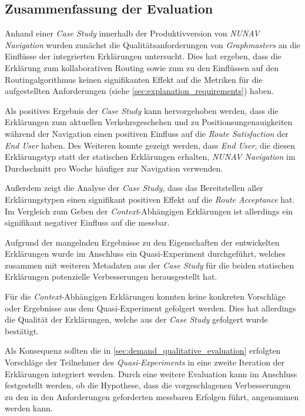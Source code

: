 \subsection{Zusammenfassung der Evaluation}

Anhand einer \textit{Case Study} innerhalb der Produktivversion von \textit{NUNAV Navigation} wurden zunächst die Qualitätsanforderungen von \textit{Graphmasters} an die Einflüsse der integrierten Erklärungen untersucht. Dies hat ergeben, dass die Erklärung zum kollaborativen Routing sowie zum zu den Einflüssen auf den Routingalgorithmus keinen signifikanten Effekt auf die Metriken für die aufgestellten Anforderungen (siehe \autoref{sec:explanation_requirements}) haben.

Als positives Ergebnis der \textit{Case Study} kann hervorgehoben werden, dass die Erklärungen zum aktuellen Verkehrsgeschehen und zu Positionsungenauigkeiten während der Navigation einen positiven Einfluss auf die \textit{Route Satisfaction} der \textit{End User} haben. Des Weiteren konnte gezeigt werden, dass \textit{End User}, die diesen Erklärungstyp statt der statischen Erklärungen erhalten, \textit{NUNAV Navigation} im Durchschnitt pro Woche häufiger zur Navigation verwenden.

Außerdem zeigt die Analyse der \textit{Case Study}, dass das Bereitstellen aller Erklärungstypen einen signifikant positiven Effekt auf die \textit{Route Acceptance} hat. Im Vergleich zum Geben der \textit{Context}-Abhängigen Erklärungen ist allerdings ein signifikant negativer Einfluss auf die  messbar.

Aufgrund der mangelnden Ergebnisse zu den Eigenschaften der entwickelten Erklärungen wurde im Anschluss ein Quasi-Experiment durchgeführt, welches zusammen mit weiteren Metadaten aus der \textit{Case Study} für die beiden statischen Erklärungen potenzielle Verbesserungen herausgestellt hat.

Für die \textit{Context}-Abhängigen Erklärungen konnten keine konkreten Vorschläge oder Ergebnisse aus dem Quasi-Experiment gefolgert werden. Dies hat allerdings die Qualität der Erklärungen, welche aus der \textit{Case Study} gefolgert wurde bestätigt.

Als Konsequenz sollten die in \autoref{sec:demand_qualitative_evaluation} erfolgten Vorschläge der Teilnehmer des \textit{Quasi-Experiments} in eine zweite Iteration der Erklärungen integriert werden. Durch eine weitere Evaluation kann im Anschluss festgestellt werden, ob die Hypothese, dass die vorgeschlagenen Verbesserungen zu den in den Anforderungen geforderten messbaren Erfolgen führt, angenommen werden kann.

